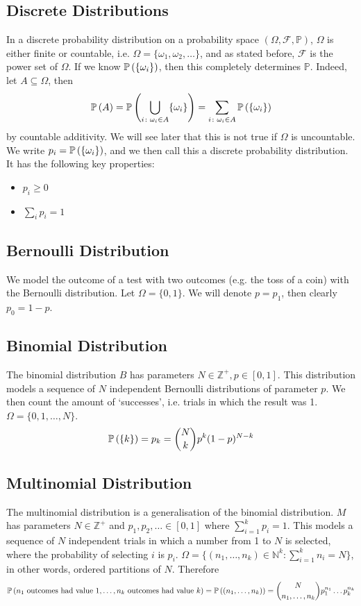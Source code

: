 \subsection{Discrete Distributions}
In a discrete probability distribution on a probability space \((\Omega, \mathcal F, \mathbb P)\), \(\Omega\) is either finite or countable, i.e. \(\Omega = \{ \omega_1, \omega_2, \dots \}\), and as stated before, \(\mathcal F\) is the power set of \(\Omega\). If we know \(\mathbb{P}\left({\{\omega_i\}}\right)\), then this completely determines \(\mathbb P\). Indeed, let \(A \subseteq \Omega\), then
\[ \mathbb{P}\left({A}\right) = \mathbb{P}\left({\bigcup_{i \colon \omega_i \in A} \{ \omega_i \}}\right) = \sum_{i \colon \omega_i \in A}\mathbb{P}\left({\{\omega_i\}}\right) \]
by countable additivity. We will see later that this is not true if \(\Omega\) is uncountable. We write \(p_i = \mathbb{P}\left({\{\omega_i\}}\right)\), and we then call this a discrete probability distribution. It has the following key properties:
\begin{itemize}
	\item \(p_i \geq 0\)
	\item \(\sum_i p_i = 1\)
\end{itemize}

\subsection{Bernoulli Distribution}
We model the outcome of a test with two outcomes (e.g. the toss of a coin) with the Bernoulli distribution. Let \(\Omega = \{ 0, 1 \}\). We will denote \(p = p_1\), then clearly \(p_0 = 1 - p\).

\subsection{Binomial Distribution}
The binomial distribution \(B\) has parameters \(N \in \mathbb Z^+, p \in [0, 1]\). This distribution models a sequence of \(N\) independent Bernoulli distributions of parameter \(p\). We then count the amount of `successes', i.e. trials in which the result was 1. \(\Omega = \{ 0, 1, \dots, N \}\).
\[ \mathbb{P}\left({\{ k \}}\right) = p_k = \binom{N}{k}p^k(1-p)^{N-k} \]

\subsection{Multinomial Distribution}
The multinomial distribution is a generalisation of the binomial distribution. \(M\) has parameters \(N \in \mathbb Z^+\) and \(p_1, p_2, \dots \in [0, 1]\) where \(\sum_{i=1}^k p_i = 1\). This models a sequence of \(N\) independent trials in which a number from 1 to \(N\) is selected, where the probability of selecting \(i\) is \(p_i\). \(\Omega = \{ (n_1, \dots, n_k) \in \mathbb N^k \colon \sum_{i=1}^k n_i = N \}\), in other words, ordered partitions of \(N\). Therefore
\[ \mathbb{P}\left({n_1 \text{ outcomes had value 1}, \dots, n_k \text{ outcomes had value }k}\right) = \mathbb{P}\left({(n_1, \dots, n_k)}\right) = \binom{N}{n_1,\dots,n_k}p_1^{n_1}\dots p_k^{n_k} \]

